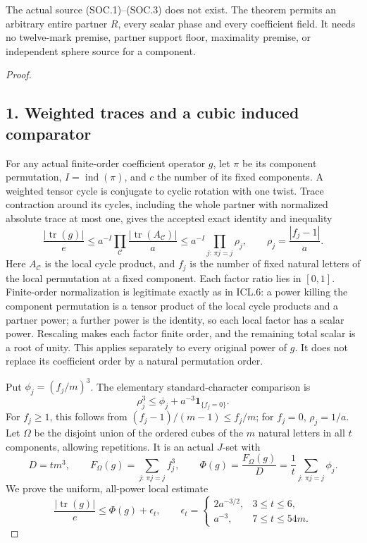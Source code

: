 \begin{theorem}[D-TD52]
The actual source (SOC.1)--(SOC.3) does not exist. The theorem permits
an arbitrary entire partner \(R\), every scalar phase and every
coefficient field. It needs no twelve-mark premise, partner support
floor, maximality premise, or independent sphere source for a component.
\end{theorem}

\begin{proof}
\subsection*{1. Weighted traces and a cubic induced comparator}

For any actual finite-order coefficient operator \(g\), let \(\pi\)
be its component permutation, \(I=\operatorname{ind}(\pi)\), and \(c\)
the number of its fixed components. A weighted tensor cycle is conjugate
to cyclic rotation with one twist. Trace contraction around its cycles,
including the whole partner with normalized absolute trace at most one,
gives the accepted exact identity and inequality
\[
 \frac{|\operatorname{tr}(g)|}{e}
 \le a^{-I}\prod_{\mathcal C}
              \frac{|\operatorname{tr}(A_{\mathcal C})|}{a}
 \le a^{-I}\prod_{j:\,\pi j=j}\rho_j,\qquad
                 \rho_j=\frac{|f_j-1|}{a}.
 \tag{SOC.4}
\]
Here \(A_{\mathcal C}\) is the local cycle product, and \(f_j\)
is the number of fixed natural letters of the local permutation at
a fixed component. Each factor ratio lies in \([0,1]\).
Finite-order normalization is legitimate exactly as in ICL.6:
a power killing the component permutation is a tensor product of
the local cycle products and a partner power; a further power is
the identity, so each local factor has a scalar power. Rescaling makes
each factor finite order, and the remaining total scalar is a root
of unity. This applies separately to every original power of \(g\).
It does not replace its coefficient order by a natural permutation order.

Put \(\phi_j=(f_j/m)^3\). The elementary standard-character comparison is
\[
       \rho_j^3\le \phi_j+a^{-3}\mathbf1_{\{f_j=0\}}.
 \tag{SOC.5}
\]
For \(f_j\ge1\), this follows from
\((f_j-1)/(m-1)\le f_j/m\); for \(f_j=0\), \(\rho_j=1/a\).
Let \(\Omega\) be the disjoint union of the ordered cubes of the
\(m\) natural letters in all \(t\) components, allowing repetitions.
It is an actual \(J\)-set with
\[
 D=tm^3,\qquad F_\Omega(g)=\sum_{j:\,\pi j=j}f_j^3,\qquad
 \Phi(g)=\frac{F_\Omega(g)}D
                  =\frac1t\sum_{j:\,\pi j=j}\phi_j.
 \tag{SOC.6}
\]
We prove the uniform, all-power local estimate
\[
 \frac{|\operatorname{tr}(g)|}{e}\le\Phi(g)+\epsilon_t,\qquad
 \epsilon_t=
 \begin{cases}
       2a^{-3/2},&3\le t\le6,\\
       a^{-3},&7\le t\le54m.
 \end{cases}
 \tag{SOC.7}
\]


\end{proof}
